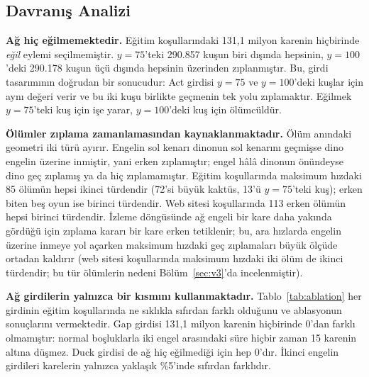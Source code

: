 \documentclass[11pt,a4paper]{article}
\begin{document}
\subsection{Davranış Analizi}

\textbf{Ağ hiç eğilmemektedir.} Eğitim koşullarındaki 131,1 milyon karenin hiçbirinde \emph{eğil} eylemi seçilmemiştir. ${y = 75}$'teki 290.857 kuşun biri dışında hepsinin, ${y = 100}$'deki 290.178 kuşun üçü dışında hepsinin üzerinden zıplanmıştır. Bu, girdi tasarımının doğrudan bir sonucudur: Act girdisi ${y = 75}$ ve ${y = 100}$'deki kuşlar için aynı değeri verir ve bu iki kuşu birlikte geçmenin tek yolu zıplamaktır. Eğilmek ${y = 75}$'teki kuş için işe yarar, ${y = 100}$'deki kuş için ölümcüldür.

\textbf{Ölümler zıplama zamanlamasından kaynaklanmaktadır.} Ölüm anındaki geometri iki türü ayırır. Engelin sol kenarı dinonun sol kenarını geçmişse dino engelin üzerine inmiştir, yani erken zıplamıştır; engel hâlâ dinonun önündeyse dino geç zıplamış ya da hiç zıplamamıştır. Eğitim koşullarında maksimum hızdaki 85 ölümün hepsi ikinci türdendir (72'si büyük kaktüs, 13'ü ${y = 75}$'teki kuş); erken biten beş oyun ise birinci türdendir. Web sitesi koşullarında 113 erken ölümün hepsi birinci türdendir. İzleme döngüsünde ağ engeli bir kare daha yakında gördüğü için zıplama kararı bir kare erken tetiklenir; bu, ara hızlarda engelin üzerine inmeye yol açarken maksimum hızdaki geç zıplamaları büyük ölçüde ortadan kaldırır (web sitesi koşullarında maksimum hızdaki iki ölüm de ikinci türdendir; bu tür ölümlerin nedeni Bölüm~\ref{sec:v3}'da incelenmiştir).

\textbf{Ağ girdilerin yalnızca bir kısmını kullanmaktadır.} Tablo~\ref{tab:ablation} her girdinin eğitim koşullarında ne sıklıkla sıfırdan farklı olduğunu ve ablasyonun sonuçlarını vermektedir. Gap girdisi 131,1 milyon karenin hiçbirinde 0'dan farklı olmamıştır: normal boşluklarla iki engel arasındaki süre hiçbir zaman 15 karenin altına düşmez. Duck girdisi de ağ hiç eğilmediği için hep 0'dır. İkinci engelin girdileri karelerin yalnızca yaklaşık \%5'inde sıfırdan farklıdır.
\end{document}
